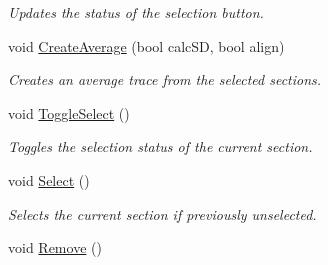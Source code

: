 \begin{DoxyCompactItemize}
\begin{DoxyCompactList}\small\item\em Updates the status of the selection button. \item\end{DoxyCompactList}\item 
void \hyperlink{classwxStfDoc_af955698664d1db45669e2be7b7c5d1dc}{CreateAverage} (bool calcSD, bool align)
\begin{DoxyCompactList}\small\item\em Creates an average trace from the selected sections. \item\end{DoxyCompactList}\item 
\hypertarget{classwxStfDoc_afa3040015e9534a75d28693f847507b2}{
void \hyperlink{classwxStfDoc_afa3040015e9534a75d28693f847507b2}{ToggleSelect} ()}
\label{classwxStfDoc_afa3040015e9534a75d28693f847507b2}

\begin{DoxyCompactList}\small\item\em Toggles the selection status of the current section. \item\end{DoxyCompactList}\item 
\hypertarget{classwxStfDoc_a3c2dd72fbf49698c82bd89de63ea580b}{
void \hyperlink{classwxStfDoc_a3c2dd72fbf49698c82bd89de63ea580b}{Select} ()}
\label{classwxStfDoc_a3c2dd72fbf49698c82bd89de63ea580b}

\begin{DoxyCompactList}\small\item\em Selects the current section if previously unselected. \item\end{DoxyCompactList}\item 
\hypertarget{classwxStfDoc_aba7a580a21ff332dd87b43ddc383c0fe}{
void \hyperlink{classwxStfDoc_aba7a580a21ff332dd87b43ddc383c0fe}{Remove} ()}
\label{classwxStfDoc_aba7a580a21ff332dd87b43ddc383c0fe}


\end{DoxyCompactItemize}
